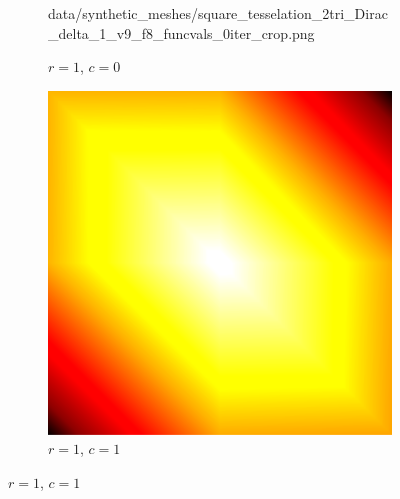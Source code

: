 \begin{figure}[ht]
\begin{subfigure}[b]{0.32\linewidth}
		{data/synthetic_meshes/square_tesselation_2tri_Dirac_delta_1_v9_f8_funcvals_0iter_crop.png}
		\caption{$r=1$, $c=0$}\label{fig:sq2.b}
	\end{subfigure}
	\begin{subfigure}[b]{0.32\linewidth}
		\includegraphics[width=\linewidth]
		{data/synthetic_meshes/square_tesselation_2tri_Dirac_delta_1_v9_f8_funcvals_1iter_crop.png}
		\caption{$r=1$, $c=1$}\label{fig:sq2.c}
	\end{subfigure}


\end{figure}
